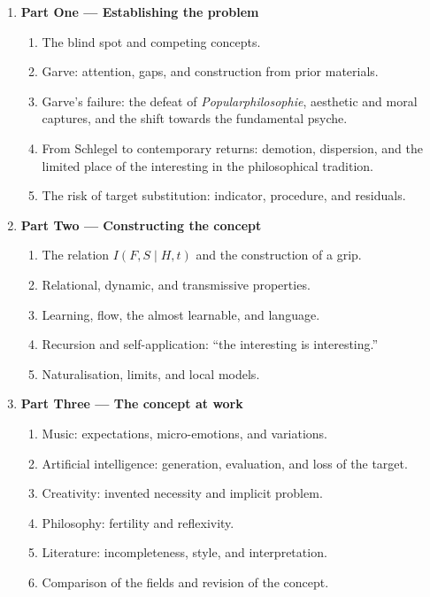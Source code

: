 \documentclass[11pt,a4paper]{article}
\begin{document}
\begin{enumerate}
  \item \textbf{Part One --- Establishing the problem}
    \begin{enumerate}
      \item The blind spot and competing concepts.
      \item Garve: attention, gaps, and construction from prior materials.
      \item Garve's failure: the defeat of \emph{Popularphilosophie}, aesthetic
            and moral captures, and the shift towards the fundamental psyche.
      \item From Schlegel to contemporary returns: demotion, dispersion, and
            the limited place of the interesting in the philosophical tradition.
      \item The risk of target substitution: indicator, procedure, and residuals.
    \end{enumerate}
  \item \textbf{Part Two --- Constructing the concept}
    \begin{enumerate}
      \item The relation \(I(F,S\mid H,t)\) and the construction of a grip.
      \item Relational, dynamic, and transmissive properties.
      \item Learning, flow, the almost learnable, and language.
      \item Recursion and self-application: ``the interesting is interesting.''
      \item Naturalisation, limits, and local models.
    \end{enumerate}
  \item \textbf{Part Three --- The concept at work}
    \begin{enumerate}
      \item Music: expectations, micro-emotions, and variations.
      \item Artificial intelligence: generation, evaluation, and loss of the
            target.
      \item Creativity: invented necessity and implicit problem.
      \item Philosophy: fertility and reflexivity.
      \item Literature: incompleteness, style, and interpretation.
      \item Comparison of the fields and revision of the concept.
    \end{enumerate}
\end{enumerate}
\end{document}
